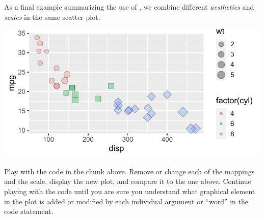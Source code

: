 \documentclass[krantz2]{krantz}\usepackage{knitr}
\begin{document}

As a final example summarizing the use of , we combine different \emph{aesthetics} and \emph{scales} in the same scatter plot.

\begin{knitrout}\footnotesize
{}\color{fgcolor}\begin{kframe}
\begin{alltt}
\hlstd{(}  \hlstd{(}   
                           \hlstd{=} 
                           \hlstd{=} 
                            \hlopt{+}
  \hlstd{(} \hlstd{=} \hlstd{,}  \hlstd{=} \hlstd{)} \hlopt{+}
  \hlstd{()} \hlopt{+}
  \hlstd{(} \hlstd{=} \hlstd{(}\hlstd{,} \hlstd{,} \hlstd{))}
\end{alltt}
\end{kframe}

{\centering \includegraphics[width=.7\textwidth]{figure/pos-scatter-18-1}

}



\end{knitrout}

\begin{playground}
Play with the code in the chunk above. Remove or change each of the mappings and the scale, display the new plot, and compare it to the one above. Continue playing with the code until you are sure you understand what graphical element in the plot is added or modified by each individual argument or ``word'' in the code statement.
\end{playground}
\end{document}
